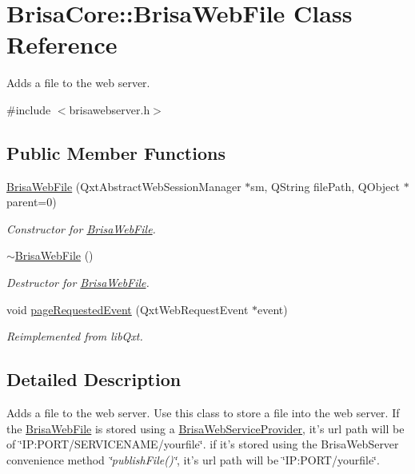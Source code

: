 \hypertarget{classBrisaCore_1_1BrisaWebFile}{
\section{BrisaCore::BrisaWebFile Class Reference}
\label{classBrisaCore_1_1BrisaWebFile}
}


Adds a file to the web server.  


{\ttfamily \#include $<$brisawebserver.h$>$}\subsection*{Public Member Functions}
\begin{DoxyCompactItemize}
\item 
\hyperlink{classBrisaCore_1_1BrisaWebFile_af33e8bc81a9cd5e6e12563ec715446d2}{BrisaWebFile} (QxtAbstractWebSessionManager $\ast$sm, QString filePath, QObject $\ast$parent=0)
\begin{DoxyCompactList}\small\item\em Constructor for \hyperlink{classBrisaCore_1_1BrisaWebFile}{BrisaWebFile}. \item\end{DoxyCompactList}\item 
\hyperlink{classBrisaCore_1_1BrisaWebFile_a6b9d26d429eb59e56d2bedffd3fded05}{$\sim$BrisaWebFile} ()
\begin{DoxyCompactList}\small\item\em Destructor for \hyperlink{classBrisaCore_1_1BrisaWebFile}{BrisaWebFile}. \item\end{DoxyCompactList}\item 
void \hyperlink{classBrisaCore_1_1BrisaWebFile_ae86d95d03f7d1d3c0acc4bc9cd7a3fac}{pageRequestedEvent} (QxtWebRequestEvent $\ast$event)
\begin{DoxyCompactList}\small\item\em Reimplemented from libQxt. \item\end{DoxyCompactList}\end{DoxyCompactItemize}


\subsection{Detailed Description}
Adds a file to the web server. Use this class to store a file into the web server. If the \hyperlink{classBrisaCore_1_1BrisaWebFile}{BrisaWebFile} is stored using a \hyperlink{classBrisaCore_1_1BrisaWebServiceProvider}{BrisaWebServiceProvider}, it's url path will be of \char`\"{}IP:PORT/SERVICENAME/yourfile\char`\"{}. if it's stored using the BrisaWebServer convenience method {\itshape \char`\"{}publishFile()\char`\"{}\/}, it's url path will be \char`\"{}IP:PORT/yourfile\char`\"{}. 

